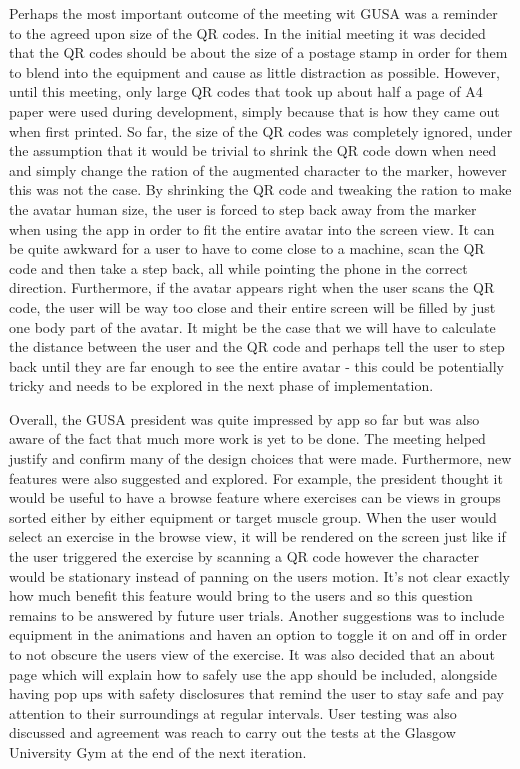 \documentclass{l4proj}
\begin{document}
Perhaps the most important outcome of the meeting wit GUSA was a reminder to the agreed upon size of the QR codes. In the initial meeting it was decided that the QR codes should be about the size of a postage stamp in order for them to blend into the equipment and cause as little distraction as possible. However, until this meeting, only large QR codes that took up about half a page of A4 paper were used during development, simply because that is how they came out when first printed. So far, the size of the QR codes was completely ignored, under the assumption that it would be trivial to shrink the QR code down when need and simply change the ration of the augmented character to the marker, however this was not the case. By shrinking the QR code and tweaking the ration to make the avatar human size, the user is forced to step back away from the marker when using the app in order to fit the entire avatar into the screen view. It can be quite awkward for a user to have to come close to a machine, scan the QR code and then take a step back, all while pointing the phone in the correct direction. Furthermore, if the avatar appears right when the user scans the QR code, the user will be way too close and their entire screen will be filled by just one body part of the avatar. It might be the case that we will have to calculate the distance between the user and the QR code and perhaps tell the user to step back until they are far enough to see the entire avatar - this could be potentially tricky and needs to be explored in the next phase of implementation. 

Overall, the GUSA president was quite impressed by app so far but was also aware of the fact that much more work is yet to be done. The meeting helped justify and confirm many of the design choices that were made. Furthermore, new features were also suggested and explored. For example, the president thought it would be useful to have a browse feature where exercises can be views in groups sorted either by either equipment or target muscle group. When the user would select an exercise in the browse view, it will be rendered on the screen just like if the user triggered the exercise by scanning a QR code however the character would be stationary instead of panning on the users motion. It's not clear exactly how much benefit this feature would bring to the users and so this question remains to be answered by future user trials. Another suggestions was to include equipment in the animations and haven an option to toggle it on and off in order to not obscure the users view of the exercise. It was also decided that an about page which will explain how to safely use the app should be included, alongside having pop ups with safety disclosures that remind the user to stay safe and pay attention to their surroundings at regular intervals. User testing was also discussed and agreement was reach to carry out the tests at the Glasgow University Gym at the end of the next iteration.
\end{document}
